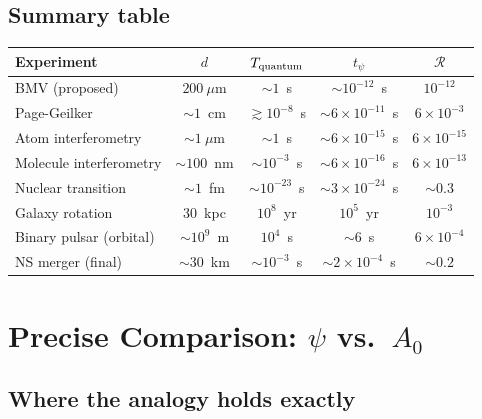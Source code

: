 \documentclass[12pt,a4paper]{article}
\begin{document}
\subsection{Summary table}

\begin{center}
\renewcommand{\arraystretch}{1.3}
\begin{tabular}{lcccc}
\toprule
\textbf{Experiment} & $d$ & $T_{\rm quantum}$ & $t_\psi$ & $\mathcal{R}$ \\
\midrule
BMV (proposed) & $200~\mu$m & $\sim 1$~s & $\sim 10^{-12}$~s & $10^{-12}$ \\
Page-Geilker & $\sim 1$~cm & $\gtrsim 10^{-8}$~s & $\sim 6\times 10^{-11}$~s & $6\times 10^{-3}$ \\
Atom interferometry & $\sim 1~\mu$m & $\sim 1$~s & $\sim 6\times 10^{-15}$~s & $6\times 10^{-15}$ \\
Molecule interferometry & $\sim 100$~nm & $\sim 10^{-3}$~s & $\sim 6\times 10^{-16}$~s & $6\times 10^{-13}$ \\
Nuclear transition & $\sim 1$~fm & $\sim 10^{-23}$~s & $\sim 3\times 10^{-24}$~s & $\sim 0.3$ \\
\midrule
Galaxy rotation & $30$~kpc & $10^{8}$~yr & $10^{5}$~yr & $10^{-3}$ \\
Binary pulsar (orbital) & $\sim 10^9$~m & $10^4$~s & $\sim 6$~s & $6\times 10^{-4}$ \\
NS merger (final) & $\sim 30$~km & $\sim 10^{-3}$~s & $\sim 2\times 10^{-4}$~s & $\sim 0.2$ \\
\bottomrule
\end{tabular}
\end{center}


\section{Precise Comparison: $\psi$ vs.\ $A_0$}
\label{sec:comparison}

\subsection{Where the analogy holds exactly}
\end{document}
